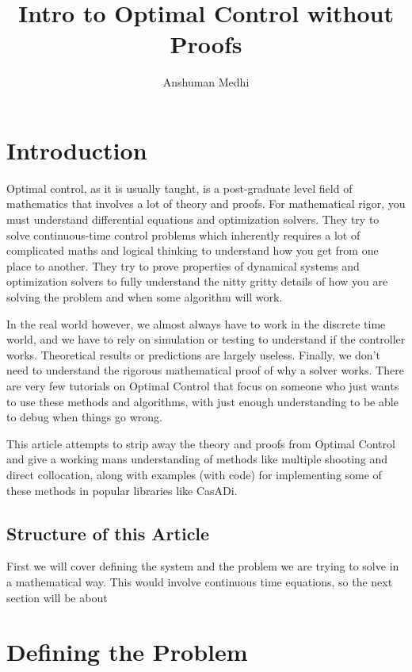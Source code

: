 \documentclass[a4paper, 10pt, twocolumn]{article}
\title{Intro to Optimal Control without Proofs}
\author{Anshuman Medhi}
\begin{document}
\maketitle
\tableofcontents

\section{Introduction}

Optimal control, as it is usually taught, is a post-graduate level field of mathematics that involves a lot of theory and proofs.
For mathematical rigor, you must understand differential equations and optimization solvers.
They try to solve continuous-time control problems which inherently requires a lot of complicated maths and logical thinking to understand how you get from one place to another.
They try to prove properties of dynamical systems and optimization solvers to fully understand the nitty gritty details of how you are solving the problem and when some algorithm will work.

In the real world however, we almost always have to work in the discrete time world, and we have to rely on simulation or testing to understand if the controller works.
Theoretical results or predictions are largely useless.
Finally, we don't need to understand the rigorous mathematical proof of why a solver works.
There are very few tutorials on Optimal Control that focus on someone who just wants to use these methods and algorithms, with just enough understanding to be able to debug when things go wrong.

This article attempts to strip away the theory and proofs from Optimal Control and give a working mans understanding of methods like multiple shooting and direct collocation, along with examples (with code) for implementing some of these methods in popular libraries like CasADi.

\subsection{Structure of this Article}

First we will cover defining the system and the problem we are trying to solve in a mathematical way. This would involve continuous time equations, so the next section will be about


\section{Defining the Problem}
\end{document}
